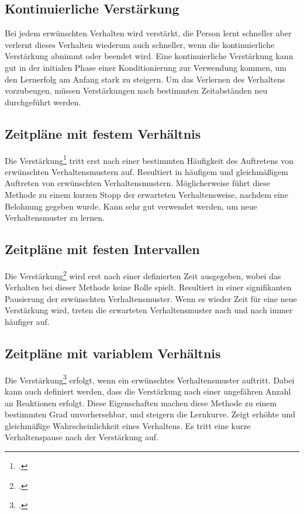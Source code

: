 \subsection{Kontinuierliche Verstärkung}
Bei jedem erwünschten Verhalten wird verstärkt, die Person lernt schneller aber verlernt dieses Verhalten wiederum auch schneller, wenn die kontinuierliche Verstärkung abnimmt oder beendet wird. 
Eine kontinuierliche Verstärkung kann gut in der initialen Phase einer Konditionierung zur Verwendung kommen, um den Lernerfolg am Anfang stark zu steigern.
Um das Verlernen des Verhaltens vorzubeugen, müssen Verstärkungen nach bestimmten Zeitabständen neu durchgeführt werden. 
\subsection{Zeitpläne mit festem Verhältnis}	
Die Verstärkung\footcite{festes-Verhaeltnis} tritt erst nach einer bestimmten Häufigkeit des Auftretens von erwünschten Verhaltensmustern auf.
Resultiert in häufigem und gleichmäßigem Auftreten von erwünschten Verhaltensmustern. Möglicherweise führt diese Methode zu einem kurzen Stopp der erwarteten Verhaltensweise, nachdem eine Belohnung gegeben wurde. 
Kann sehr gut verwendet werden, um neue Verhaltensmuster zu lernen.
\subsection{Zeitpläne mit festen Intervallen}
Die Verstärkung\footcite{fester-Intervall} wird erst nach einer definierten Zeit ausgegeben, wobei das Verhalten bei dieser Methode keine Rolle spielt. 
Resultiert in einer signifikanten Pausierung der erwünschten Verhaltensmuster. Wenn es wieder Zeit für eine neue Verstärkung wird, treten die erwarteten Verhaltensmuster nach und nach immer häufiger auf.
\newpage
\subsection{Zeitpläne mit variablem Verhältnis}
Die Verstärkung\footcite{variables-Verhaeltnis} erfolgt, wenn ein erwünschtes Verhaltensmuster auftritt. Dabei kann auch definiert werden, dass die Verstärkung nach einer ungefähren Anzahl an Reaktionen erfolgt. Diese Eigenschaften machen diese Methode zu einem bestimmten Grad unvorhersehbar, und steigern die Lernkurve. 
Zeigt erhöhte und gleichmäßige Wahrscheinlichkeit eines Verhaltens. Es tritt eine kurze Verhaltenspause nach der Verstärkung auf. 
